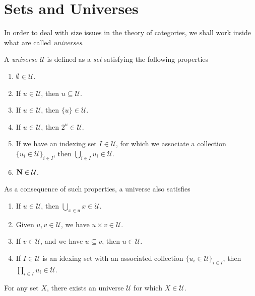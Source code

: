 \section{Sets and Universes}

In order to deal with size issues in the theory of categories, we shall work
inside what are called \emph{universes}.

\begin{definition}[Universe]
    \label{def:universe}
    A \emph{universe} \(\mathcal U\) is defined as a \emph{set} satisfying the
    following properties
    \begin{enumerate}[(U1)]\setlength\itemsep{0em}
        \item \(\emptyset \in \mathcal U\).
        \item If \(u \in \mathcal U\), then \(u \subseteq \mathcal U\).
        \item If \(u \in \mathcal U\), then \(\{u\} \in \mathcal U\).
        \item If \(u \in \mathcal U\), then \(2^u \in \mathcal U\).
        \item If we have an indexing set \(I \in \mathcal U\), for which we associate
              a collection \(\{u_i \in \mathcal U\}_{i \in I}\), then \(\bigcup_{i \in I} u_i
              \in \mathcal U\).
        \item \(\mathbf{N} \in \mathcal U\).
    \end{enumerate}
    As a consequence of such properties, a universe also satisfies
    \begin{enumerate}[(U1)]\setlength\itemsep{0em}
        \setcounter{enumi}{6}
        \item If \(u \in \mathcal U\), then \(\bigcup_{x \in u} x \in \mathcal U\).
        \item Given \(u, v \in \mathcal U\), we have \(u \times v \in \mathcal U\).
        \item If \(v \in \mathcal U\), and we have \(u \subseteq v\), then \(u \in
              \mathcal U\).
        \item If \(I \in \mathcal U\) is an idexing set with an associated collection
              \(\{u_{i} \in \mathcal U\}_{i \in I}\), then \(\prod_{i \in I} u_i \in
              \mathcal U\).
    \end{enumerate}
\end{definition}

\begin{axiom}
    \label{def:Grothendieck-axiom-ZF-set-theory}
    For any set \(X\), there exists an universe \(\mathcal U\) for which \(X \in
    \mathcal U\).
\end{axiom}

